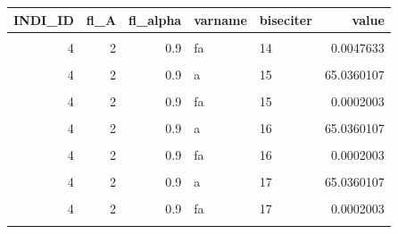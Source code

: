 \documentclass[
]{book}
\begin{document}
\begin{table}[!h]
\centering
\begin{tabular}{r|r|r|l|l|r}
\hline
INDI\_ID & fl\_A & fl\_alpha & varname & biseciter & value\\
\hline
\cellcolor{gray!6}{4} & \cellcolor{gray!6}{2} & \cellcolor{gray!6}{0.9} & \cellcolor{gray!6}{b} & \cellcolor{gray!6}{14} & \cellcolor{gray!6}{65.0390625}\\
\hline
4 & 2 & 0.9 & fa & 14 & 0.0047633\\
\hline
\cellcolor{gray!6}{4} & \cellcolor{gray!6}{2} & \cellcolor{gray!6}{0.9} & \cellcolor{gray!6}{fb} & \cellcolor{gray!6}{14} & \cellcolor{gray!6}{-0.0043628}\\
\hline
4 & 2 & 0.9 & a & 15 & 65.0360107\\
\hline
\cellcolor{gray!6}{4} & \cellcolor{gray!6}{2} & \cellcolor{gray!6}{0.9} & \cellcolor{gray!6}{b} & \cellcolor{gray!6}{15} & \cellcolor{gray!6}{65.0390625}\\
\hline
4 & 2 & 0.9 & fa & 15 & 0.0002003\\
\hline
\cellcolor{gray!6}{4} & \cellcolor{gray!6}{2} & \cellcolor{gray!6}{0.9} & \cellcolor{gray!6}{fb} & \cellcolor{gray!6}{15} & \cellcolor{gray!6}{-0.0043628}\\
\hline
4 & 2 & 0.9 & a & 16 & 65.0360107\\
\hline
\cellcolor{gray!6}{4} & \cellcolor{gray!6}{2} & \cellcolor{gray!6}{0.9} & \cellcolor{gray!6}{b} & \cellcolor{gray!6}{16} & \cellcolor{gray!6}{65.0375366}\\
\hline
4 & 2 & 0.9 & fa & 16 & 0.0002003\\
\hline
\cellcolor{gray!6}{4} & \cellcolor{gray!6}{2} & \cellcolor{gray!6}{0.9} & \cellcolor{gray!6}{fb} & \cellcolor{gray!6}{16} & \cellcolor{gray!6}{-0.0020812}\\
\hline
4 & 2 & 0.9 & a & 17 & 65.0360107\\
\hline
\cellcolor{gray!6}{4} & \cellcolor{gray!6}{2} & \cellcolor{gray!6}{0.9} & \cellcolor{gray!6}{b} & \cellcolor{gray!6}{17} & \cellcolor{gray!6}{65.0367737}\\
\hline
4 & 2 & 0.9 & fa & 17 & 0.0002003\\
\hline
\cellcolor{gray!6}{4} & \cellcolor{gray!6}{2} & \cellcolor{gray!6}{0.9} & \cellcolor{gray!6}{fb} & \cellcolor{gray!6}{17} & \cellcolor{gray!6}{-0.0009405}\\
\hline
\end{tabular}
\end{table}
\end{document}
